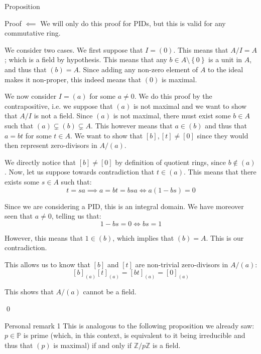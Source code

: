 \documentclass[a4paper]{article}
\begin{document}
\begin{parag}{Proposition}
    \begin{subparag}{Proof $\impliedby$}
        We will only do this proof for PIDs, but this is valid for any commutative ring.

        We consider two cases. We first suppose that $I = \left(0\right)$. This means that $A/ I = A$; which is a field by hypothesis. This means that any $b \in A \setminus \left\{0\right\}$ is a unit in $A$, and thus that $\left(b\right) = A$. Since adding any non-zero element of $A$ to the ideal makes it non-proper, this indeed means that $\left(0\right)$ is maximal.

        We now consider $I = \left(a\right)$ for some $a \neq 0$. We do this proof by the contrapositive, i.e. we suppose that $\left(a\right)$ is not maximal and we want to show that $A / I$ is not a field. Since $\left(a\right)$ is not maximal, there must exist some $b \in A$ such that $\left(a\right) \subsetneq \left(b\right) \subsetneq A$. This however means that $a \in \left(b\right)$ and thus that $a = bt$ for some $t \in A$. We want to show that $\left[b\right], \left[t\right] \neq \left[0\right]$ since they would then represent zero-divisors in $A/\left(a\right)$.
 
        We directly notice that $\left[b\right] \neq \left[0\right]$ by definition of quotient rings, since $b \not \in \left(a\right)$. Now, let us suppose towards contradiction that $t \in \left(a\right)$. This means that there exists some $s \in A$ such that: 
        \[t = sa \implies a = bt = bsa \iff a\left(1 - bs\right) = 0\]

        Since we are considering a PID, this is an integral domain. We have moreover seen that $a \neq 0$, telling us that: 
        \[1 - bs = 0 \iff bs = 1\]
        
        However, this means that $1 \in \left(b\right)$, which implies that $\left(b\right) = A$. This is our contradiction.

        This allows us to know that $\left[b\right]$ and $\left[t\right]$ are non-trivial zero-divisors in $A / \left(a\right)$:
        \[\left[b\right]_{\left(a\right)} \left[t\right]_{\left(a\right)} = \left[bt\right]_{\left(a\right)} = \left[0\right]_{\left(a\right)}\]
        
        This shows that $A / \left(a\right)$ cannot be a field.

        \qed
    \end{subparag}

    \begin{subparag}{Personal remark 1}
        This is analogous to the following proposition we already saw: $p \in \mathbb{P}$ is prime (which, in this context, is equivalent to it being irreducible and thus that $\left(p\right)$ is maximal) if and only if $\mathbb{Z}/p\mathbb{Z}$ is a field.


\end{subparag}
\end{parag}
\end{document}
